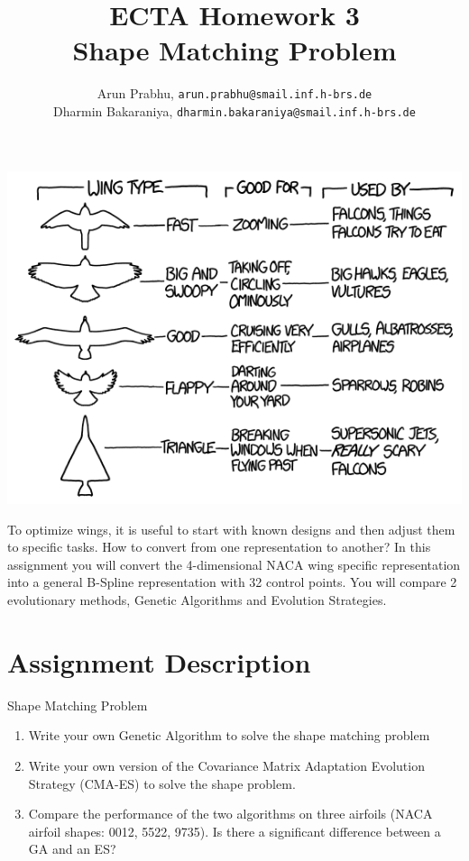 \documentclass{article}
\title{ECTA Homework 3\\Shape Matching Problem}
\author{\color{blue}Arun Prabhu, \texttt{arun.prabhu@smail.inf.h-brs.de}\\
\color{blue}Dharmin Bakaraniya, \texttt{dharmin.bakaraniya@smail.inf.h-brs.de}}
\begin{document}
\maketitle
\begin{center}
	\begin{minipage}{1\linewidth}
		\centering
			\includegraphics[scale=0.6]{wingtypes.png}
	\end{minipage}
\end{center}

To optimize wings, it is useful to start with known designs and then adjust them to specific tasks. How to convert from one representation to another? In this assignment you will convert the 4-dimensional NACA wing specific representation into a general B-Spline representation with 32 control points. You will compare 2 evolutionary methods, Genetic Algorithms and Evolution Strategies.

\newpage

\section{Assignment Description}
	Shape Matching Problem
	\begin{enumerate}
		\item Write your own Genetic Algorithm to solve the shape matching problem
		\item Write your own version of the Covariance Matrix Adaptation Evolution Strategy (CMA-ES) to solve the shape problem.
		\item Compare the performance of the two algorithms on three airfoils (NACA airfoil shapes: 0012, 5522, 9735). Is there a significant difference between a GA and an ES? 
	\end{enumerate}
\end{document}

